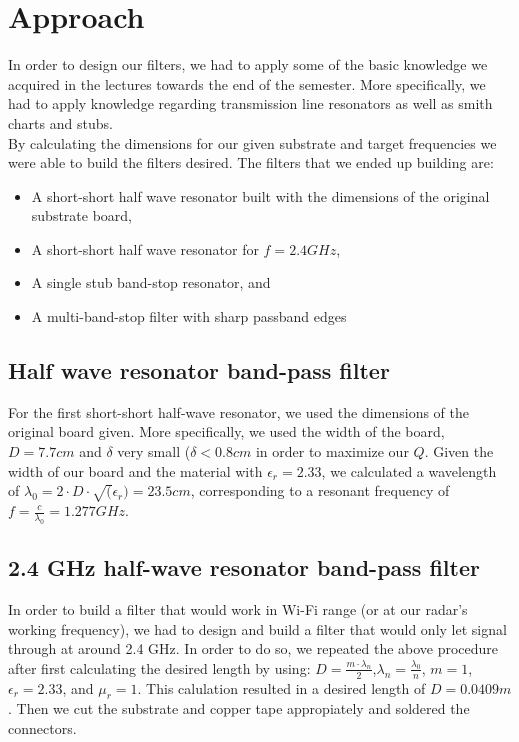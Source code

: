 \documentclass[letterpaper, 11pt, twocolumn]{article}
\begin{document}
\section{Approach}
In order to design our filters, we had to apply some of the basic knowledge we acquired in the lectures towards the end of the semester. More specifically, we had to apply knowledge regarding transmission line resonators as well as smith charts and stubs.
\\
By calculating the dimensions for our given substrate and target frequencies we were able to build the filters desired. The filters that we ended up building are:
\begin{itemize}
    \item A short-short half wave resonator built with the dimensions of the original substrate board,
    \item A short-short half wave resonator for $f=2.4 GHz$,
    \item A single stub band-stop resonator, and
    \item A multi-band-stop filter with sharp passband edges
\end{itemize}
\subsection{Half wave resonator band-pass filter}
For the first short-short half-wave resonator, we used the dimensions of the original board given. More specifically, we used the width of the board, $D=7.7cm$ and $\delta$ very small (\(\delta<0.8cm\) in order to maximize our $Q$. Given the width of our board and the material with $\epsilon_r=2.33$, we calculated a wavelength of \(\lambda_0=2\cdot D \cdot\sqrt(\epsilon_r)=23.5cm\), corresponding to a resonant frequency of $f=\frac{c}{\lambda_0}=1.277GHz$.

\subsection{2.4 GHz half-wave resonator band-pass filter}
In order to build a filter that would work in Wi-Fi range (or at our radar's working frequency), we had to design and build a filter that would only let signal through at around 2.4 GHz. In order to do so, we repeated the above procedure after first calculating the desired length by using: \(D=\frac{m\cdot\lambda_n}{2}\),\(\lambda_n=\frac{\lambda_0}{n}\), \(m=1\),\(\epsilon_r=2.33\), and \(\mu_r=1\). This calulation resulted in a desired length of \(D=0.0409m\). Then we cut the substrate and copper tape appropiately and soldered the connectors. 
\end{document}
